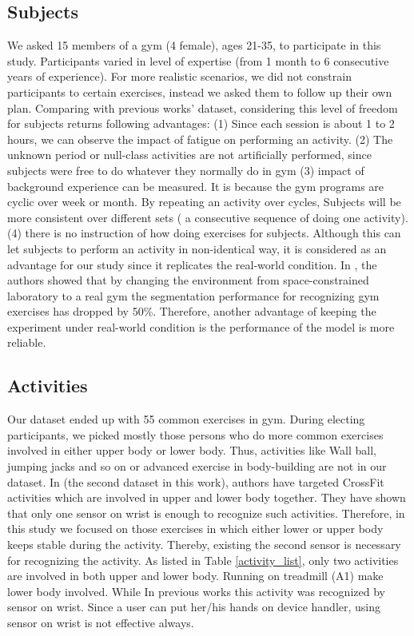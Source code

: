 \documentclass[journal,article,submit,moreauthors,pdftex]{Definitions/mdpi}
\begin{document}
\subsection{Subjects}
We asked 15 members of a gym (4 female), ages 21-35, to participate in this study. Participants varied in level of expertise (from 1 month to 6 consecutive years of experience). For more realistic scenarios, we did not constrain participants to certain exercises, instead we asked them to follow up their own plan. Comparing with previous works' dataset, considering this level of freedom for subjects returns following advantages: (1) Since each session is about 1 to 2 hours, we can observe the impact of fatigue on performing an activity. (2) The unknown period or null-class activities are not artificially performed, since subjects were free to do whatever they normally do in gym (3) impact of background experience can be measured. It is because the gym programs are cyclic over week or month. By repeating an activity over cycles, Subjects will be more consistent over different sets ( a consecutive sequence of doing one activity). (4) there is no instruction of how doing exercises for subjects. Although this can let subjects to perform an activity in non-identical way, it is considered as an advantage for our study since it replicates the real-world condition. In \cite{morris2014recofit}, the authors showed that by changing the environment from space-constrained laboratory to a real gym the segmentation performance for recognizing gym exercises has dropped by 50\%. Therefore, another advantage of keeping the experiment under real-world condition is the performance of the model is more reliable.\\
\subsection{Activities}
Our dataset ended up with 55 common exercises in gym. During electing participants, we picked mostly those persons who do more common exercises involved in either upper body or lower body. Thus, activities like Wall ball, jumping jacks and so on or advanced exercise in body-building are not in our dataset. In \cite{soro2019recognition} (the second dataset in this work), authors have targeted CrossFit activities which are involved in upper and lower body together. They have shown that only one sensor on wrist is enough to recognize such activities. Therefore, in this study we focused on those exercises in which either lower or upper body keeps stable during the activity. Thereby, existing the second sensor is necessary for recognizing the activity. As listed in Table \ref{activity_list}, only two activities are involved in both upper and lower body. Running on treadmill (A1) make lower body involved. While In previous works this activity was recognized by sensor on wrist. Since a user can put her/his hands on device handler, using sensor on wrist is not effective always. \\
\end{document}
